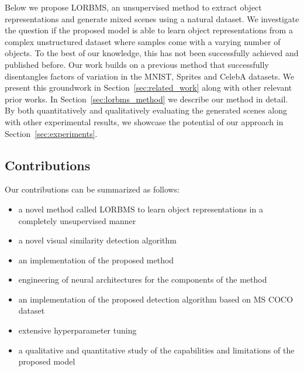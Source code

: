 \documentclass[12pt,a4paper]{article}
\begin{document}
\vspace{5mm}
Below we propose LORBMS, an unsupervised method to extract object representations and generate mixed scenes using a natural dataset. We investigate the question if the proposed model is able to learn object representations from a complex unstructured dataset where samples come with a varying number of objects. To the best of our knowledge, this has not been successfully achieved and published before. Our work builds on a previous method that successfully disentangles factors of variation in the MNIST, Sprites and CelebA datasets. We present this groundwork in Section~\ref{sec:related_work} along with other relevant prior works. In Section~\ref{sec:lorbms_method} we describe our method in detail. By both quantitatively and qualitatively evaluating the generated scenes along with other experimental results, we showcase the potential of our approach in Section~\ref{sec:experiments}.  

\subsection{Contributions}
Our contributions can be summarized as follows:
\begin{itemize}
  \item a novel method called LORBMS to learn object representations in a completely unsupervised manner
  \item a novel visual similarity detection algorithm
  \item an implementation of the proposed method
  \item engineering of neural architectures for the components of the method
  \item an implementation of the proposed detection algorithm based on MS COCO dataset
  \item extensive hyperparameter tuning
  \item a qualitative and quantitative study of the capabilities and limitations of the proposed model
\end{itemize}
\end{document}
